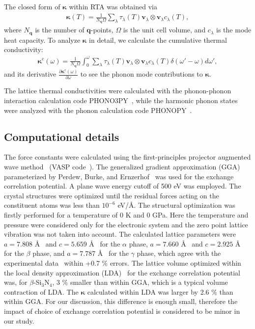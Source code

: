 \documentclass[twocolumn,amsmath,amssymb,a4paper,prb,superscriptaddress,floatfix]{revtex4-1}
\begin{document}
The closed form of $\boldsymbol{\kappa}$ within RTA was obtained via
\begin{align}
 \label{eq:kappa}
 \boldsymbol{\kappa}(T) = \frac{1}{N_\mathbf{q}\Omega} \sum_\lambda
 \tau_\lambda(T) \mathbf{v}_\lambda \otimes \mathbf{v}_\lambda c_\lambda(T),
\end{align}
where $N_\mathbf{q}$ is the number of
$\mathbf{q}$-points, $\Omega$ is the unit cell volume, and $c_\lambda$
is the mode heat capacity. To analyze $\boldsymbol{\kappa}$ in detail, we calculate
the cumulative thermal conductivity:
\begin{align}
 \label{eq:cum-kappa}
 \boldsymbol{\kappa}^\text{c}(\omega) = \frac{1}{N_\mathbf{q}\Omega}
 \int_0^\omega \sum_\lambda
 \tau_\lambda(T) \mathbf{v}_\lambda \otimes \mathbf{v}_\lambda
 c_\lambda(T) \delta(\omega'-\omega)d\omega',
\end{align}
and its derivative $\frac{\partial
\boldsymbol{\kappa}^\text{c}(\omega)}{\partial \omega}$ to see the phonon mode
contributions to $\boldsymbol{\kappa}$.

The lattice thermal conductivities were calculated with the phonon-phonon interaction calculation code
PHONO3PY~\cite{phono3py}, while the harmonic phonon states were analyzed with
the phonon calculation code PHONOPY~\cite{phonopy}.

\subsection{Computational details}

The force constants were calculated using the first-principles projector
augmented wave method~\cite{paw} (VASP code~\cite{vasp-1996,vasp-1995,
vasp-1999}). The generalized gradient approximation (GGA) parameterized by
Perdew, Burke, and Ernzerhof~\cite{pbe} was used for the exchange correlation
potential. A plane wave energy cutoff of 500 eV was employed. The crystal
structures were optimized until the residual forces acting
on the constituent atoms was less than $10^{-6}$ eV/\AA. The structural
optimization was firstly performed for a temperature of 0 K and 0 GPa. Here the
temperature and pressure were considered only for the electronic system and the
zero point lattice vibration was not taken into account. The calculated lattice
parameters were $a=7.808$ \AA~ and $c=5.659$ \AA~ for the $\alpha$ phase,
$a=7.660$ \AA~ and $c=2.925$ \AA~ for the $\beta$ phase, and $a=7.787$ \AA~
for the $\gamma$ phase, which agree with the experimental
data~\cite{yashima,boulay,paszkowicz} within +0.7 \% errors. The lattice
volume optimized within the local density approximation
(LDA)~\cite{lda} for the exchange correlation potential was, for
$\beta$-Si$_3$N$_4$, 3 \% smaller than within GGA, which is a typical
volume contraction of LDA. The $\boldsymbol{\kappa}$ calculated within LDA was larger by 2.6 \% than within GGA. For
our discussion, this difference is enough small, therefore the impact of
choice of exchange correlation potential is considered to be minor in our
study.
\end{document}
